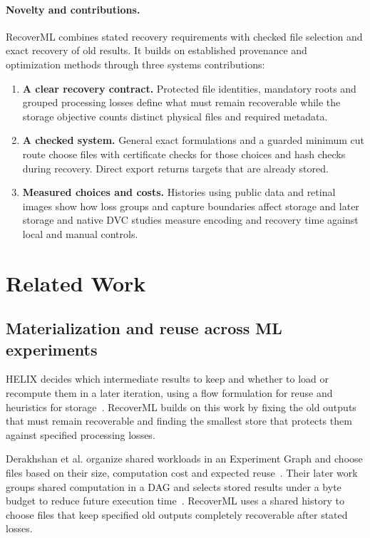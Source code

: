 \paragraph{Novelty and contributions.}
RecoverML combines stated recovery requirements with checked file selection and exact recovery of old results. It builds on established provenance and optimization methods through three systems contributions:

\begin{enumerate}
  \item \textbf{A clear recovery contract.} Protected file identities, mandatory roots and grouped processing losses define what must remain recoverable while the storage objective counts distinct physical files and required metadata.
  \item \textbf{A checked system.} General exact formulations and a guarded minimum cut route choose files with certificate checks for those choices and hash checks during recovery. Direct export returns targets that are already stored.
  \item \textbf{Measured choices and costs.} Histories using public data and retinal images show how loss groups and capture boundaries affect storage and later storage and native DVC studies measure encoding and recovery time against local and manual controls.
\end{enumerate}

\section{Related Work}

\subsection{Materialization and reuse across ML experiments}

HELIX decides which intermediate results to keep and whether to load or recompute them in a later iteration, using a flow formulation for reuse and heuristics for storage~\cite{helix}. RecoverML builds on this work by fixing the old outputs that must remain recoverable and finding the smallest store that protects them against specified processing losses.

Derakhshan et al. organize shared workloads in an Experiment Graph and choose files based on their size, computation cost and expected reuse~\cite{collab}. Their later work groups shared computation in a DAG and selects stored results under a byte budget to reduce future execution time~\cite{productionreuse}. RecoverML uses a shared history to choose files that keep specified old outputs completely recoverable after stated losses.

